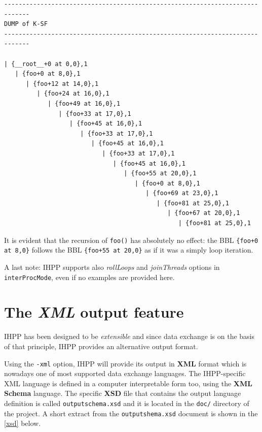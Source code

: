 \documentclass[a4paper,10pt]{report}
\begin{document}
\begin{lstlisting}[label=out14, frame=bottomline,
caption={partial output of IHPP analysis in \texttt{interProcMode} of \texttt{prog4}}]
-----------------------------------------------------------------------------
DUMP of K-SF
-----------------------------------------------------------------------------

| {__root__+0 at 0,0},1
   | {foo+0 at 8,0},1
      | {foo+12 at 14,0},1
         | {foo+24 at 16,0},1
            | {foo+49 at 16,0},1
               | {foo+33 at 17,0},1
                  | {foo+45 at 16,0},1
                     | {foo+33 at 17,0},1
                        | {foo+45 at 16,0},1
                           | {foo+33 at 17,0},1
                              | {foo+45 at 16,0},1
                                 | {foo+55 at 20,0},1
                                    | {foo+0 at 8,0},1
                                       | {foo+69 at 23,0},1
                                          | {foo+81 at 25,0},1
                                             | {foo+67 at 20,0},1
                                                | {foo+81 at 25,0},1

\end{lstlisting}

\noindent
It is evident that the recursion of \verb|foo()| has absolutely no effect:
the BBL \verb|{foo+0 at 8,0}| follows the BBL \verb|{foo+55 at 20,0}| as if 
it was a simply loop iteration.

A last note: IHPP supports also \emph{rollLoops} and \emph{joinThreads} options
in \verb|interProcMode|, even if no examples are provided here.

\section{The \emph{XML} output feature}

IHPP has been designed to be \emph{extensible} and since data exchange is on the basis
of that principle, IHPP provides an alternative output format.

Using the \verb|-xml| option, IHPP will provide its output in \textbf{XML} format
which is nowadays one of most supported data exchange languages.
The IHPP-specific XML language is defined in a computer interpretable form too, 
using the \textbf{XML Schema} language. 
The specific \textbf{XSD} file that contains the output language definition 
is called \verb|outputschema.xsd| and it is located in the \verb|doc/| directory
of the project. A short extract from the \verb|outputshema.xsd| document is 
shown in the \cref{xsd} below.
\end{document}
